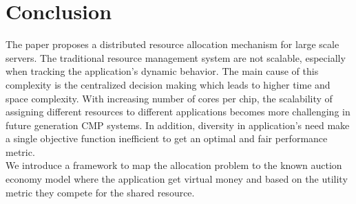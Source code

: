 \section{Conclusion} \label{Conclusion}
The paper proposes a distributed resource allocation mechanism for large scale servers. The traditional resource management system are not scalable, especially when tracking the application's dynamic behavior. The main cause of this complexity is the centralized decision making which leads to higher time and space complexity. With increasing number of cores per chip, the scalability of assigning different resources to different applications becomes more challenging in future generation CMP systems. In addition, diversity in application's need make a single objective function inefficient to get an optimal and fair performance metric.    \\
\indent We introduce a framework to map the allocation problem to the known auction economy model where the application get virtual money and based on the utility metric they compete for the shared resource.
